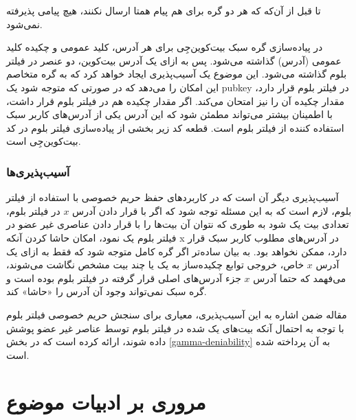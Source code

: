  
 تا قبل از آن‌که که هر دو گره برای هم پیام همتا ارسال نکنند، هیچ پیامی پذیرفته نمی‌شود.

\newpage

در پیاده‌سازی گره سبک بیت‌کوین‌جِی
 \cite{bitcoinj}
برای هر آدرس، کلید عمومی و چکیده کلید عمومی (آدرس) گذاشته می‌شود. پس به ازای یک آدرس بیت‌کوین، دو عنصر در فیلتر بلوم گذاشته می‌شود. این موضوع یک آسیب‌پذیری ایجاد خواهد کرد که به گره متخاصم این امکان را می‌دهد که در صورتی که متوجه شود یک pubkey در فیلتر بلوم قرار دارد، مقدار چکیده آن را نیز امتحان می‌کند. اگر مقدار چکیده هم در فیلتر بلوم قرار داشت، با اطمینان بیشتر می‌تواند مطمئن شود که این آدرس یکی از آدرس‌های کاربر سبک استفاده کننده از فیلتر بلوم است. قطعه کد زیر بخشی از پیاده‌سازی فیلتر بلوم در کد بیت‌کوین‌جِی است.



\subsubsection{آسیب‌‌پذیری‌ها }
\label{Vulnerabilities}
آسیب‌پذیری دیگر آن‌ است که در کاربرد‌های حفظ حریم خصوصی با استفاده از فیلتر بلوم، لازم است که به این مسئله توجه شود که اگر با قرار دادن آدرس $x$ در فیلتر بلوم، تعدادی بیت یک شود به طوری که نتوان آن بیت‌ها را با قرار دادن عناصری غیر عضو در فیلتر بلوم یک نمود، امکان حاشا کردن آنکه x در آدرس‌های مطلوب کاربر سبک قرار دارد، ممکن نخواهد بود. به بیان ساده‌تر اگر گره کامل متوجه شود که فقط به ازای یک آدرس $x$ خاص، خروجی توابع چکیده‌ساز به یک یا چند بیت مشخص نگاشت می‌شوند، می‌فهمد که حتما آدرس  $x$ جزء آدرس‌های اصلی قرار گرفته در فیلتر بلوم بوده است و گره سبک نمی‌تواند وجود آن آدرس را «حاشا» کند.

مقاله \cite{Bianchi2012} ضمن اشاره به این آسیب‌پذیری، معیاری برای سنجش حریم خصوصی فیلتر بلوم با توجه به احتمال آنکه بیت‌های یک شده در فیلتر بلوم توسط عناصر غیر عضو پوشش داده شوند، ارائه کرده است که در بخش \ref{gamma-deniability} به آن پرداخته شده است.


\section{مروری بر ادبیات موضوع}
\label{LitReview}

